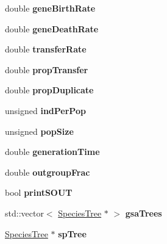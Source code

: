 \begin{DoxyCompactItemize}
\item 
\mbox{\label{class_simulator_a326077ed8ca491b83a4d0eeaa204d126}} 
double {\bfseries gene\+Birth\+Rate}
\item 
\mbox{\label{class_simulator_a24d9deceb3ff05d56fd10ad11215045b}} 
double {\bfseries gene\+Death\+Rate}
\item 
\mbox{\label{class_simulator_a49cc449e3f51f3295b78f740d7df58fa}} 
double {\bfseries transfer\+Rate}
\item 
\mbox{\label{class_simulator_a5970e663047823de02d4fae87188936f}} 
double {\bfseries prop\+Transfer}
\item 
\mbox{\label{class_simulator_a8df7f8d554eda45b873fbd6f78e4cb13}} 
double {\bfseries prop\+Duplicate}
\item 
\mbox{\label{class_simulator_aaa955e40c2a1eac8c1b2e8f0b56e2abb}} 
unsigned {\bfseries ind\+Per\+Pop}
\item 
\mbox{\label{class_simulator_a4947162ee0da82ea1317727986c3cb40}} 
unsigned {\bfseries pop\+Size}
\item 
\mbox{\label{class_simulator_ae349983db8f9e1a995cac05ae1cba5e9}} 
double {\bfseries generation\+Time}
\item 
\mbox{\label{class_simulator_a9af5bf95e488f1e0bcceb02f0587c6f4}} 
double {\bfseries outgroup\+Frac}
\item 
\mbox{\label{class_simulator_ac56195883559364983f0f6b9d076d66b}} 
bool {\bfseries print\+S\+O\+UT}
\item 
\mbox{\label{class_simulator_aaec5ca415d0893606508f7fe5b42d811}} 
std\+::vector$<$ \mbox{\hyperlink{class_species_tree}{Species\+Tree}} $\ast$ $>$ {\bfseries gsa\+Trees}
\item 
\mbox{\label{class_simulator_a9d7c1978d7330d49a0d75b4185ccf2ff}} 
\mbox{\hyperlink{class_species_tree}{Species\+Tree}} $\ast$ {\bfseries sp\+Tree}

\end{DoxyCompactItemize}
